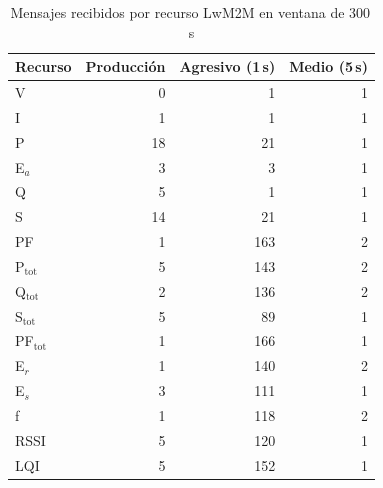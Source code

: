 \begin{table}[htbp]
\centering
\caption{Mensajes recibidos por recurso LwM2M en ventana de 300\,s}
\label{tab:benchmark-per-key}
\footnotesize
\begin{tabular}{lrrr}
\toprule
\textbf{Recurso} & \textbf{Producción} & \textbf{Agresivo (1\,s)} & \textbf{Medio (5\,s)} \\
\midrule
V & 0 & 1 & 1 \\
I & 1 & 1 & 1 \\
P & 18 & 21 & 1 \\
E$_a$ & 3 & 3 & 1 \\
Q & 5 & 1 & 1 \\
S & 14 & 21 & 1 \\
PF & 1 & 163 & 2 \\
P$_\mathrm{tot}$ & 5 & 143 & 2 \\
Q$_\mathrm{tot}$ & 2 & 136 & 2 \\
S$_\mathrm{tot}$ & 5 & 89 & 1 \\
PF$_\mathrm{tot}$ & 1 & 166 & 1 \\
E$_r$ & 1 & 140 & 2 \\
E$_s$ & 3 & 111 & 1 \\
f & 1 & 118 & 2 \\
RSSI & 5 & 120 & 1 \\
LQI & 5 & 152 & 1 \\
\bottomrule
\end{tabular}
\end{table}
